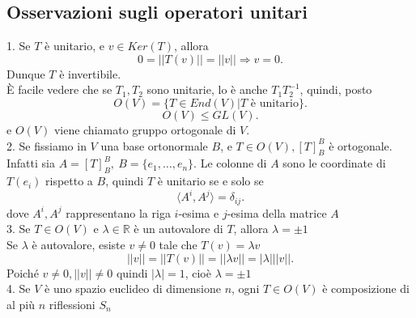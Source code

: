 \documentclass[12px]{article}
\begin{document}
\subsection{Osservazioni sugli operatori unitari}
1. Se $T$ è unitario, e $v\in Ker(T)$, allora
\[
 0 = ||T(v)|| = ||v|| \Rightarrow  v = 0
.\] 
Dunque $T$ è invertibile.\\
È facile vedere che se $T_1,T_2$ sono unitarie, lo è anche $T_1T_2^{-1}$, quindi, posto
\[
	O(V) = \{T\in End(V)| T \text{ è unitario}\}
.\] 
\[
O(V) \leq GL(V)
.\] 
e $O(V)$ viene chiamato gruppo ortogonale di $V$.\\[10px]
2. Se fissiamo in  $V$ una base ortonormale $B$, e $T\in O(V), [T]^B_B$ è ortogonale.\\
Infatti sia $A = [T]_B^B, \ B = \{e_1,\ldots,e_n\}$. Le colonne di $A$ sono le coordinate di $T(e_i)$ rispetto a $B$, quindi $T $ è unitario se e solo se
\[
	\langle A^i, A^j \rangle = \delta_{ij}
.\] 
dove $A^i, A^j$ rappresentano la riga $i$-esima e $j$-esima della matrice $A$\\[10px]
3. Se $T\in O(V)$ e $\lambda\in \mathbb{R}$ è un autovalore di $T$, allora $\lambda = \pm 1$ \\
Se $\lambda$ è autovalore, esiste $v\neq 0$ tale che $T(v) = \lambda v$ 
\[
||v|| = ||T(v)|| = ||\lambda v|| = |\lambda|||v||
.\] 
Poiché $v\neq 0, ||v|| \neq 0$ quindi $|\lambda| = 1$, cioè $\lambda = \pm 1$\\[10px]
4. Se $V$ è uno spazio euclideo di dimensione $n$, ogni $T\in O(V)$ è composizione di al più $n$ riflessioni $S_n$\\
\end{document}
